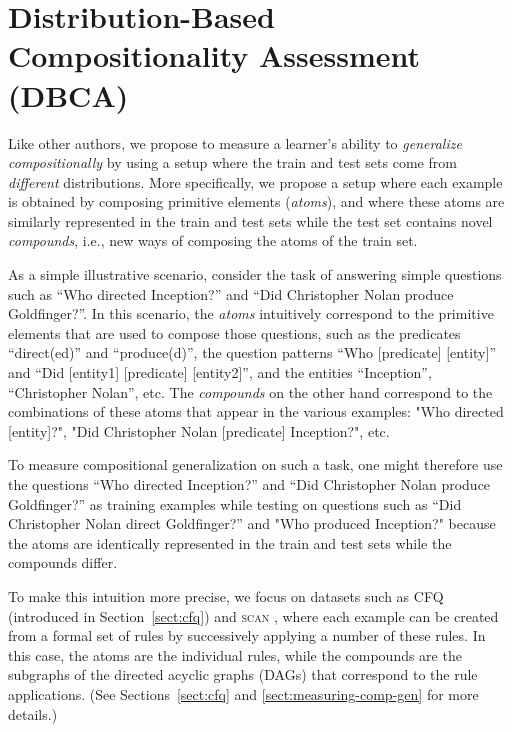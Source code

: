 \documentclass[letterpaper]{article}
\newcommand{\SCAN}{\textsc{scan}}
\begin{document}
\section{Distribution-Based Compositionality Assessment (DBCA)}
\label{sect:cdm}
\vspace{-1ex}


Like other authors, we propose to measure a learner's ability to {\em generalize compositionally} by using a setup where the train and test sets come from {\em different} distributions. More specifically, we propose a setup where each example is obtained by composing primitive elements (\textit{atoms}), and where these atoms are similarly represented in the train and test sets while the test set contains novel \textit{compounds}, i.e., new ways of composing the atoms of the train set.

As a simple illustrative scenario, consider the task of answering simple questions such as ``Who directed Inception?'' and ``Did Christopher Nolan produce Goldfinger?''. In this scenario, the {\em atoms} intuitively correspond to the primitive elements that are used to compose those questions, such as the predicates ``direct(ed)'' and ``produce(d)'', the question patterns ``Who [predicate] [entity]'' and ``Did [entity1] [predicate] [entity2]'', and the entities ``Inception'', ``Christopher Nolan'', etc. The {\em compounds} on the other hand correspond to the combinations of these atoms that appear in the various examples: "Who directed [entity]?", "Did Christopher Nolan [predicate] Inception?", etc.

To measure compositional generalization on such a task, one might therefore use the questions ``Who directed Inception?'' and ``Did Christopher Nolan produce Goldfinger?'' as training examples while testing on questions such as ``Did Christopher Nolan direct Goldfinger?'' and "Who produced Inception?" because the atoms are identically represented in the train and test sets while the compounds differ.

To make this intuition more precise, we focus on datasets such as CFQ (introduced in Section~\ref{sect:cfq}) and \SCAN{} \citep{Lake2018GeneralizationWS}, where each example can be created from a formal set of rules by successively applying a number of these rules. In this case, the atoms are the individual rules, while the compounds are the subgraphs of the directed acyclic graphs (DAGs) that correspond to the rule applications. (See Sections~\ref{sect:cfq} and \ref{sect:measuring-comp-gen} for more details.)
\vspace{-1ex}
\end{document}
